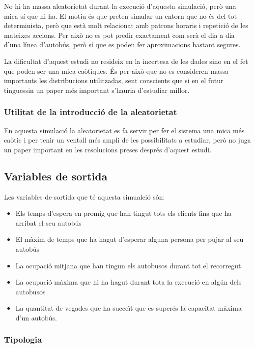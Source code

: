 \documentclass[a4paper,10pt]{article}
\begin{document}
No hi ha massa aleatorietat durant la execució d'aquesta simulació, però una mica sí que hi ha. El motiu és que preten simular un entorn que no és del tot determinista, però que està molt relacionat amb patrons horaris i repetició de les mateixes accions. Per això no es pot predir exactament com serà el dia a dia d'una línea d'autobús, però sí que es poden fer aproximacions bastant segures.

La dificultat d'aquest estudi no resideix en la incertesa de les dades sino en el fet que poden ser una mica caòtiques. És per això que no es consideren massa importants les distribucions utilitzadas, sent conscients que si en el futur tinguessin un paper més important s'hauria d'estudiar millor.

\subsubsection{Utilitat de la introducció de la aleatorietat}

En aquesta simulació la aleatorietat es fa servir per fer el sistema una mica més caòtic i per tenir un ventall més ampli de les possibilitats a estudiar, però no juga un paper important en les resolucions preses després d'aquest estudi.


\subsection{Variables de sortida}

Les variables de sortida que té aquesta simualció són:
\begin{itemize}
 \item Els temps d'espera en promig que han tingut tots els clients fins que ha arribat el seu autobús
 \item El màxim de temps que ha hagut d'esperar alguna persona per pujar al seu autobús
 \item La ocupació mitjana que han tingun els autobusos durant tot el recorregut
 \item La ocupació màxima que hi ha hagut durant tota la execució en algún dels autobusos
 \item La quantitat de vegades que ha succeït que es superés la capacitat màxima d'un autobús.
\end{itemize}


\subsubsection{Tipologia}
\end{document}
